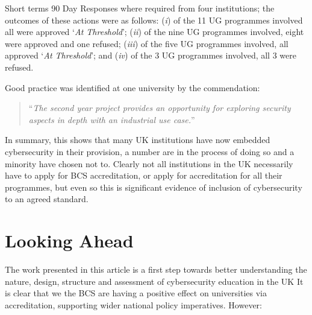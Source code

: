 \documentclass[a4paper,11pt]{article}
\begin{document}
Short terms 90 Day Responses where required from four institutions; the outcomes of these actions were as follows: ({\emph{i}}) of the 11 UG programmes involved all were approved `{\emph{At Threshold}}'; ({\emph{ii}}) of the nine UG programmes involved, eight were approved and one refused; ({\emph{iii}}) of the five UG programmes involved, all approved `{\emph{At Threshold}}'; and ({\emph{iv}}) of the 3 UG programmes involved, all 3 were refused.

 
Good practice was identified at one university by the commendation:

 \begin{quote}
``{\emph{The second year project provides an opportunity for exploring security aspects in depth with an industrial use case.}}''
\end{quote}

In summary, this shows that many UK institutions have now embedded cybersecurity in their provision, a number are in the process of doing so and a minority have chosen not to. Clearly not all institutions in the UK necessarily have to apply for BCS accreditation, or apply for accreditation for all their programmes, but even so this is significant evidence of inclusion of cybersecurity to an agreed standard.

\section*{Looking Ahead}

The work presented in this article is a first step towards better understanding the nature, design, structure and assessment of cybersecurity education in the UK It is clear that we the BCS are having a positive effect on universities via accreditation, supporting wider national policy imperatives. However:
\end{document}
